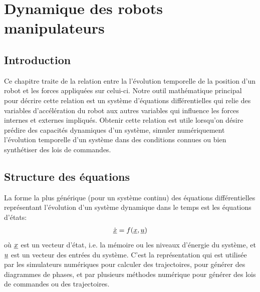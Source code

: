 \chapter{Dynamique des robots manipulateurs}
\label{sec:dynamic}



\section{Introduction}

Ce chapitre traite de la relation entre la l'évolution temporelle de la position d'un robot et les forces appliquées sur celui-ci. Notre outil mathématique principal pour décrire cette relation est un système d'équations différentielles qui relie des variables d'accélération du robot aux autres variables qui influence les forces internes et externes impliqués. Obtenir cette relation est utile lorsqu'on désire prédire des capacités dynamiques d'un système, simuler numériquement l'évolution temporelle d'un système dans des conditions connues ou bien synthétiser des lois de commandes.




\section{Structure des équations}
La forme la plus générique (pour un système continu) des équations différentielles représentant l'évolution d'un système dynamique dans le temps est les équations d'états:
\begin{align}
\dot{\underline{x}} = f( \underline{x}, \underline{u})
\end{align}
où $\underline{x}$ est un vecteur d'état, i.e. la mémoire ou les niveaux d'énergie du système, et $\underline{u}$ est un vecteur des entrées du système. C'est la représentation qui est utilisée par les simulateurs numériques pour calculer des trajectoires, pour générer des diagrammes de phases, et par plusieurs méthodes numérique pour générer des lois de commandes ou des trajectoires. 

